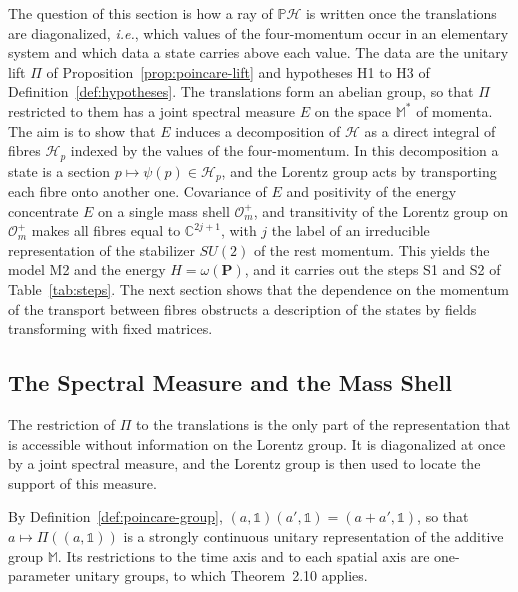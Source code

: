 The question of this section is how a ray of $\mathbb{P}\mathcal{H}$ is written once the translations are diagonalized, \textit{i.e.}, which values of the four-momentum occur in an elementary system and which data a state carries above each value. The data are the unitary lift $\Pi$ of Proposition~\ref{prop:poincare-lift} and hypotheses H1 to H3 of Definition~\ref{def:hypotheses}. The translations form an abelian group, so that $\Pi$ restricted to them has a joint spectral measure $E$ on the space $\mathbb{M}^*$ of momenta. The aim is to show that $E$ induces a decomposition of $\mathcal{H}$ as a direct integral of fibres $\mathcal{H}_p$ indexed by the values of the four-momentum. In this decomposition a state is a section $p\mapsto\psi(p)\in\mathcal{H}_p$, and the Lorentz group acts by transporting each fibre onto another one. Covariance of $E$ and positivity of the energy concentrate $E$ on a single mass shell $\mathcal{O}_m^+$, and transitivity of the Lorentz group on $\mathcal{O}_m^+$ makes all fibres equal to $\mathbb{C}^{2j+1}$, with $j$ the label of an irreducible representation of the stabilizer $SU(2)$ of the rest momentum. This yields the model M2 and the energy $H=\omega(\mathbf{P})$, and it carries out the steps S1 and S2 of Table~\ref{tab:steps}. The next section shows that the dependence on the momentum of the transport between fibres obstructs a description of the states by fields transforming with fixed matrices.

\subsection{The Spectral Measure and the Mass Shell}
\label{subsec:spectral-mass-shell}

The restriction of $\Pi$ to the translations is the only part of the representation that is accessible without information on the Lorentz group. It is diagonalized at once by a joint spectral measure, and the Lorentz group is then used to locate the support of this measure.

By Definition~\ref{def:poincare-group}, $(a,\mathbb{1})(a',\mathbb{1})=(a+a',\mathbb{1})$, so that $a\mapsto\Pi((a,\mathbb{1}))$ is a strongly continuous unitary representation of the additive group $\mathbb{M}$. Its restrictions to the time axis and to each spatial axis are one-parameter unitary groups, to which Theorem~2.10 applies.

